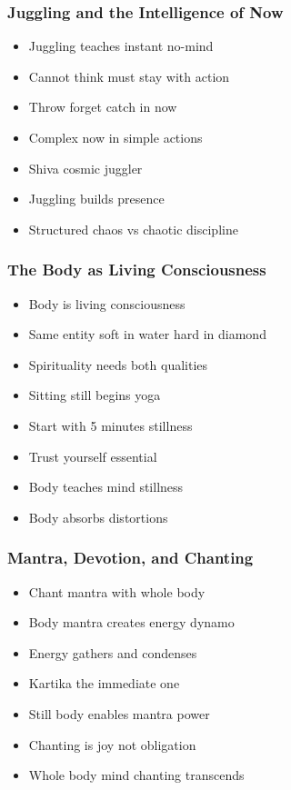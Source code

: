 \begin{frame}[fragile]\frametitle{Juggling and the Intelligence of Now}
  \begin{itemize}
    \item Juggling teaches instant no-mind
    \item Cannot think must stay with action
    \item Throw forget catch in now
    \item Complex now in simple actions
    \item Shiva cosmic juggler
    \item Juggling builds presence
    \item Structured chaos vs chaotic discipline
  \end{itemize}
\end{frame}

\begin{frame}[fragile]\frametitle{The Body as Living Consciousness}
  \begin{itemize}
    \item Body is living consciousness
    \item Same entity soft in water hard in diamond
    \item Spirituality needs both qualities
    \item Sitting still begins yoga
    \item Start with 5 minutes stillness
    \item Trust yourself essential
    \item Body teaches mind stillness
    \item Body absorbs distortions
  \end{itemize}
\end{frame}

\begin{frame}[fragile]\frametitle{Mantra, Devotion, and Chanting}
  \begin{itemize}
    \item Chant mantra with whole body
    \item Body mantra creates energy dynamo
    \item Energy gathers and condenses
    \item Kartika the immediate one
    \item Still body enables mantra power
    \item Chanting is joy not obligation
    \item Whole body mind chanting transcends
  \end{itemize}
\end{frame}

